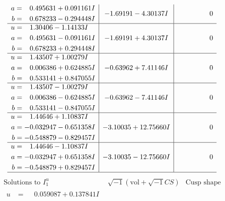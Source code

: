 \documentclass[1p]{elsarticle_modified}
\theoremstyle{definition}
\newcommand{\I}{\sqrt{-1}}
\begin{document}
$$\begin{array}{c|c|c}
\begin{aligned}
a &= \phantom{-}0.495631 + 0.091161 I \\
b &= \phantom{-}0.678233 - 0.294448 I\end{aligned}
 & -1.69191 - 4.30137 I & \phantom{-0.000000 } 0 \\ \hline\begin{aligned}
u &= \phantom{-}1.30406 - 1.14133 I \\
a &= \phantom{-}0.495631 - 0.091161 I \\
b &= \phantom{-}0.678233 + 0.294448 I\end{aligned}
 & -1.69191 + 4.30137 I & \phantom{-0.000000 } 0 \\ \hline\begin{aligned}
u &= \phantom{-}1.43507 + 1.00279 I \\
a &= \phantom{-}0.006386 + 0.624885 I \\
b &= \phantom{-}0.533141 + 0.847055 I\end{aligned}
 & -0.63962 + 7.41146 I & \phantom{-0.000000 } 0 \\ \hline\begin{aligned}
u &= \phantom{-}1.43507 - 1.00279 I \\
a &= \phantom{-}0.006386 - 0.624885 I \\
b &= \phantom{-}0.533141 - 0.847055 I\end{aligned}
 & -0.63962 - 7.41146 I & \phantom{-0.000000 } 0 \\ \hline\begin{aligned}
u &= \phantom{-}1.44646 + 1.10837 I \\
a &= -0.032947 - 0.651358 I \\
b &= -0.548879 - 0.829457 I\end{aligned}
 & -3.10035 + 12.75660 I & \phantom{-0.000000 } 0 \\ \hline\begin{aligned}
u &= \phantom{-}1.44646 - 1.10837 I \\
a &= -0.032947 + 0.651358 I \\
b &= -0.548879 + 0.829457 I\end{aligned}
 & -3.10035 - 12.75660 I & \phantom{-0.000000 } 0\\
 \hline 
 \end{array}$$\newpage$$\begin{array}{c|c|c}  
\text{Solutions to }I^u_{1}& \I (\text{vol} + \sqrt{-1}CS) & \text{Cusp shape}\\
 \hline 
\begin{aligned}
u &= \phantom{-}0.059087 + 0.137841 I \\

\end{aligned}
\end{array}$$
\end{document}
